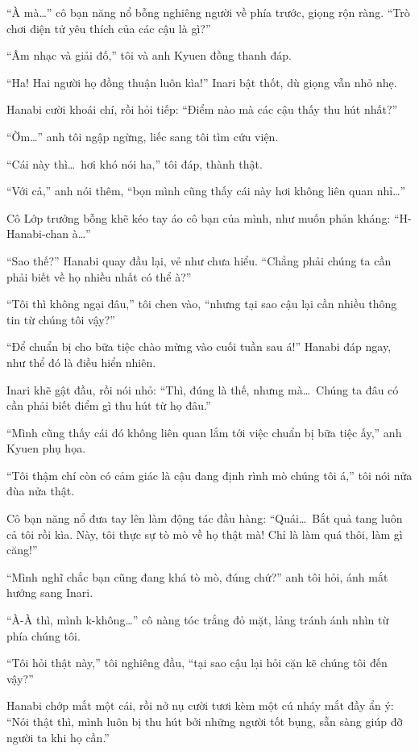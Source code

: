 \documentclass[../main.tex]{subfiles}
\begin{document}
``À mà\dots'' cô bạn năng nổ bỗng nghiêng người về phía trước, giọng rộn ràng. ``Trò chơi điện tử yêu thích của các cậu là gì?''

``Âm nhạc và giải đố,'' tôi và anh Kyuen đồng thanh đáp.

``Ha! Hai người họ đồng thuận luôn kìa!'' Inari bật thốt, dù giọng vẫn nhỏ nhẹ.

Hanabi cười khoái chí, rồi hỏi tiếp: ``Điểm nào mà các cậu thấy thu hút nhất?''

``Ờm\dots'' anh tôi ngập ngừng, liếc sang tôi tìm cứu viện.

``Cái này thì\dots\ hơi khó nói ha,'' tôi đáp, thành thật.

``Với cả,'' anh nói thêm, ``bọn mình cũng thấy cái này hơi không liên quan nhỉ\dots''

Cô Lớp trưởng bỗng khẽ kéo tay áo cô bạn của mình, như muốn phản kháng: ``H-Hanabi-chan à\dots''

``Sao thế?'' Hanabi quay đầu lại, vẻ như chưa hiểu. ``Chẳng phải chúng ta cần phải biết về họ nhiều nhất có thể à?''

``Tôi thì không ngại đâu,'' tôi chen vào, ``nhưng tại sao cậu lại cần nhiều thông tin từ chúng tôi vậy?''

``Để chuẩn bị cho bữa tiệc chào mừng vào cuối tuần sau á!'' Hanabi đáp ngay, như thể đó là điều hiển nhiên.

Inari khẽ gật đầu, rồi nói nhỏ: ``Thì, đúng là thế, nhưng mà\dots\ Chúng ta đâu có cần phải biết điểm gì thu hút từ họ đâu.''

``Mình cũng thấy cái đó không liên quan lắm tới việc chuẩn bị bữa tiệc ấy,'' anh Kyuen phụ họa.

``Tôi thậm chí còn có cảm giác là cậu đang định rình mò chúng tôi á,'' tôi nói nửa đùa nửa thật.

Cô bạn năng nổ đưa tay lên làm động tác đầu hàng:  ``Quái\dots\ Bắt quả tang luôn cả tôi rồi kìa. Này, tôi thực sự tò mò về họ thật mà! Chỉ là làm quá thôi, làm gì căng!''

``Mình nghĩ chắc bạn cũng đang khá tò mò, đúng chứ?'' anh tôi hỏi, ánh mắt hướng sang Inari.

``À-À thì, mình k-không\dots'' cô nàng tóc trắng đỏ mặt, lảng tránh ánh nhìn từ phía chúng tôi.

``Tôi hỏi thật này,'' tôi nghiêng đầu, ``tại sao cậu lại hỏi cặn kẽ chúng tôi đến vậy?''

Hanabi chớp mắt một cái, rồi nở nụ cười tươi kèm một cú nháy mắt đầy ẩn ý: ``Nói thật thì, mình luôn bị thu hút bởi những người tốt bụng, sẵn sàng giúp đỡ người ta khi họ cần.''
\end{document}
